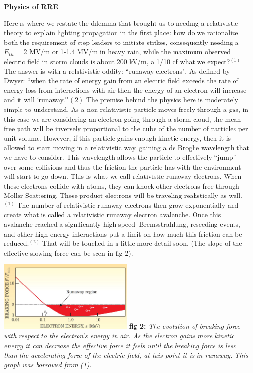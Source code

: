 \documentclass[11pt]{article}
\begin{document}
\begin{multicols*}{2}
    \noindent
{\bf \LARGE Physics of RRE}
    
    Here is where we restate the dilemma that brought us to needing a relativistic theory to explain lighting propagation in the first place: how do we rationalize both the requirement of step leaders to initiate strikes, consequently needing a $E_{th}$ = 2 MV/m or 1-1.4 MV/m in heavy rain, while the maximum observed electric field in storm clouds is about 200 kV/m, a 1/10 of what we expect?$^{(1)}$ The answer is with a relativistic oddity: ``runaway electrons". As defined by Dwyer: ``when the rate of energy gain from an electric field exceeds the rate of energy loss from interactions with air then the energy of an electron will increase and it will `runaway.'"${(2)}$ The premise behind the physics here is moderately simple to understand. As a non-relativistic particle moves freely through a gas, in this case we are considering an electron going through a storm cloud, the mean free path will be inversely proportional to the cube of the number of particles per unit volume. However, if this particle gains enough kinetic energy, then it is allowed to start moving in a relativistic way, gaining a de Broglie wavelength that we have to consider. This wavelength allows the particle to effectively “jump” over some collisions and thus the friction the particle has with the environment will start to go down. This is what we call relativistic runaway electrons. When these electrons collide with atoms, they can knock other electrons free through Moller Scattering. These product electrons will be traveling realistically as well.$^{(1)}$ The number of relativistic runaway electrons then grow exponentially and create what is called a relativistic runaway electron avalanche. Once this avalanche reached a significantly high speed, Bremsstrahlung, reseeding events, and other high energy interactions put a limit on how much this friction can be reduced.$^{(2)}$ That will be touched in a little more detail soon. (The slope of the effective slowing force can be seen in fig 2).
    
    \noindent
    \includegraphics[width=0.5\textwidth]{images/Breaking Plot.JPG}
    \textbf{fig 2:} \textit{The evolution of breaking force with respect to the electron's energy in air. As the electron gains more kinetic energy it can decrease the effective force it feels until the breaking force is less than the accelerating force of the electric field, at this point it is in runaway. This graph was borrowed from (1).}
    

\end{multicols*}
\end{document}
